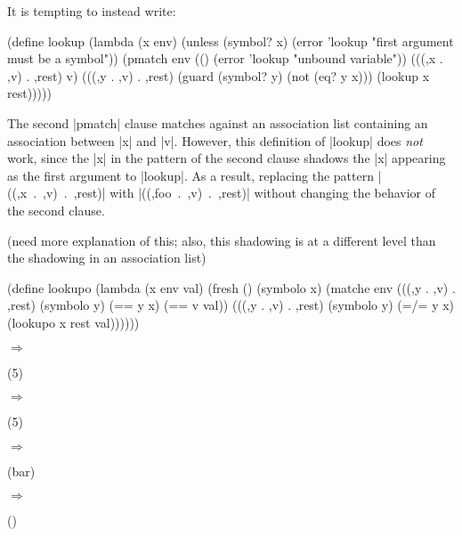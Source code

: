 It is tempting to instead write:

\begin{schemedisplay}
(define lookup
  (lambda (x env)
    (unless (symbol? x)
      (error 'lookup "first argument must be a symbol"))
    (pmatch env
      (() (error 'lookup "unbound variable"))
      (((,x . ,v) . ,rest)
       v)
      (((,y . ,v) . ,rest) (guard (symbol? y) (not (eq? y x)))
       (lookup x rest)))))
\end{schemedisplay}

The second \scheme|pmatch| clause matches against an association list
containing an association between \scheme|x| and \scheme|v|.  However,
this definition of \scheme|lookup| does \emph{not} work, since the
\scheme|x| in the pattern of the second clause shadows the \scheme|x|
appearing as the first argument to \scheme|lookup|.  As a result,
replacing the pattern \mbox{\scheme|((,x . ,v) . ,rest)|} with
\mbox{\scheme|((,foo . ,v) . ,rest)|} without changing the behavior of
the second clause.

(need more explanation of this; also, this shadowing is at a different
level than the shadowing in an association list)




\begin{schemedisplay}
(define lookupo
  (lambda (x env val)
    (fresh ()
      (symbolo x)
      (matche env
        (((,y . ,v) . ,rest) (symbolo y)
         (== y x) (== v val))
        (((,y . ,v) . ,rest) (symbolo y)
         (=/= y x) (lookupo x rest val))))))
\end{schemedisplay}

\noindent{} $\Rightarrow$
\begin{schemeresponsebox}(5)\end{schemeresponsebox}

\noindent{} $\Rightarrow$
\begin{schemeresponsebox}(5)\end{schemeresponsebox}

\noindent{} $\Rightarrow$
\begin{schemeresponsebox}(bar)\end{schemeresponsebox}

\noindent{} $\Rightarrow$
\begin{schemeresponsebox}()\end{schemeresponsebox}

